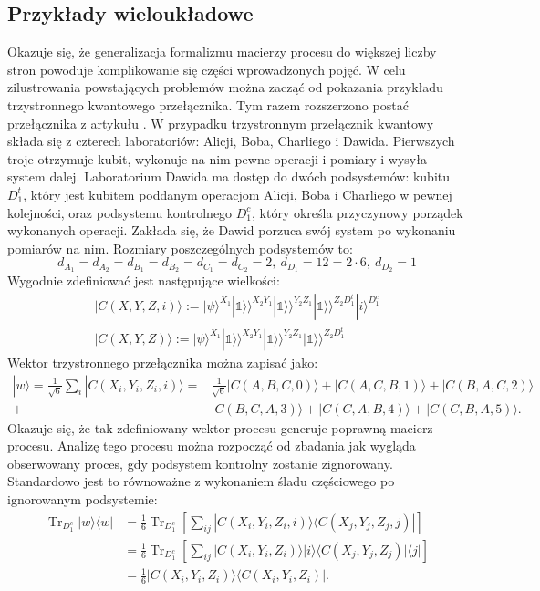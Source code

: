 \documentclass[10pt]{article} %
\DeclareMathOperator{\Trs}{Tr}
\newcommand{\Ket}[1]{|#1\rangle}
\newcommand{\Bra}[1]{\langle#1|}
\newcommand{\KKet}[1]{|#1\rangle\rangle}
\newcommand{\I}{\mathbb{1}}
\begin{document}
\subsection{Przykłady wieloukładowe}
Okazuje się, że generalizacja formalizmu macierzy procesu do większej liczby stron powoduje komplikowanie się części wprowadzonych pojęć. W celu zilustrowania powstających problemów można zacząć od pokazania przykładu trzystronnego kwantowego przełącznika. Tym razem rozszerzono postać przełącznika z artykułu \cite{causal_witness}. W przypadku trzystronnym przełącznik kwantowy składa się z czterech laboratoriów: Alicji, Boba, Charliego i Dawida. Pierwszych troje otrzymuje kubit, wykonuje na nim pewne operacji i pomiary i wysyła system dalej. Laboratorium Dawida ma dostęp do dwóch podsystemów: kubitu $D_1^t$, który jest kubitem poddanym operacjom Alicji, Boba i Charliego w pewnej kolejności, oraz podsystemu kontrolnego $D_1^c$, który określa przyczynowy porządek wykonanych operacji. Zakłada się, że Dawid porzuca swój system po wykonaniu pomiarów na nim. Rozmiary poszczególnych podsystemów to:
\begin{equation}
d_{A_1} = d_{A_2} = d_{B_1} = d_{B_2} = d_{C_1} = d_{C_2} = 2,~ d_{D_1} = 12 = 2 \cdot 6,~d_{D_2}=1
\end{equation}
Wygodnie zdefiniować jest następujące wielkości:
\begin{gather}
\Ket{C(X,Y,Z, i)} := \Ket{\psi}^{X_1}\KKet{\I}^{X_2Y_1}\KKet{\I}^{Y_2Z_1}\KKet{\I}^{Z_2D_1^t}\Ket{i}^{D_1^c} \\
\Ket{C(X,Y,Z)} := \Ket{\psi}^{X_1}\KKet{\I}^{X_2Y_1}\KKet{\I}^{Y_2Z_1}\KKet{\I}^{Z_2D_1^t}
\end{gather}
Wektor trzystronnego przełącznika można zapisać jako:
\begin{equation}
\begin{split}
\Ket{w} = \frac{1}{\sqrt{6}} \sum_i \Ket{C(X_i, Y_i, Z_i, i)} =& \frac{1}{\sqrt{6}} \Ket{C(A,B,C,0)} + \Ket{C(A,C,B,1)} + \Ket{C(B,A,C,2)} \\ +& \Ket{C(B,C,A,3)} + \Ket{C(C,A,B,4)} + \Ket{C(C,B,A,5)}.
\end{split}
\end{equation}
Okazuje się, że tak zdefiniowany wektor procesu generuje poprawną macierz procesu. Analizę tego procesu można rozpocząć od zbadania jak wygląda obserwowany proces, gdy podsystem kontrolny zostanie zignorowany. Standardowo jest to równoważne z wykonaniem śladu częściowego po ignorowanym podsystemie:
\begin{equation}
\begin{split}
\Trs_{D_1^c} \Ket{w}\Bra{w} &= \frac{1}{6}\Trs_{D_1^c} \left[ \sum_{ij} \Ket{C(X_i, Y_i, Z_i, i)}\Bra{C(X_j, Y_j, Z_j, j)}\right] \\
&=  \frac{1}{6}\Trs_{D_1^c} \left[ \sum_{ij} \Ket{C(X_i, Y_i, Z_i)}\Ket{i}\Bra{C(X_j, Y_j, Z_j)}\Bra{j}\right] \\ 
&= \frac{1}{6}\Ket{C(X_i, Y_i, Z_i)}\Bra{C(X_i, Y_i, Z_i)}.
\end{split}
\end{equation}
\end{document}
